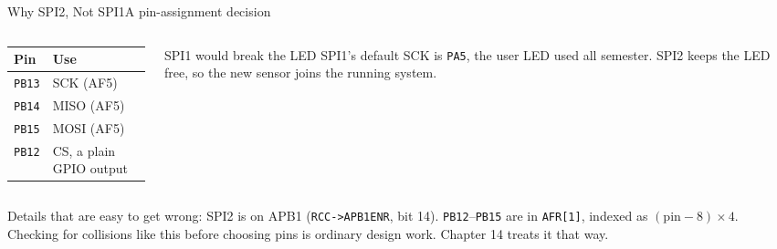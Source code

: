 \documentclass[9pt,aspectratio=169,xcolor=table]{beamer}
\begin{document}
\begin{frame}{Why SPI2, Not SPI1}{A pin-assignment decision}
    \begin{columns}[T]
    \begin{column}{.5\textwidth}
        \begin{center}
        {\small
        \striped
        \begin{tabular}{@{}l l@{}}
            \toprule
            \textbf{Pin} & \textbf{Use} \\
            \midrule
            \texttt{PB13} & SCK  (AF5) \\
            \texttt{PB14} & MISO (AF5) \\
            \texttt{PB15} & MOSI (AF5) \\
            \texttt{PB12} & CS, a plain GPIO output \\
            \bottomrule
        \end{tabular}}
        \end{center}
    \end{column}
    \begin{column}{.46\textwidth}
        \begin{block}{SPI1 would break the LED}
            {\small SPI1's default SCK is \alert{\texttt{PA5}}, the user LED used all semester. SPI2 keeps the LED free, so the new sensor joins the running system.}
        \end{block}
    \end{column}
    \end{columns}

    \vspace{3mm}
    {\small Details that are easy to get wrong: SPI2 is on \alert{APB1} (\texttt{RCC->APB1ENR}, bit 14). \texttt{PB12}--\texttt{PB15} are in \texttt{AFR[1]}, indexed as $(\text{pin}-8)\times 4$. Checking for collisions like this before choosing pins is ordinary design work. Chapter 14 treats it that way.}
\end{frame}
\end{document}
